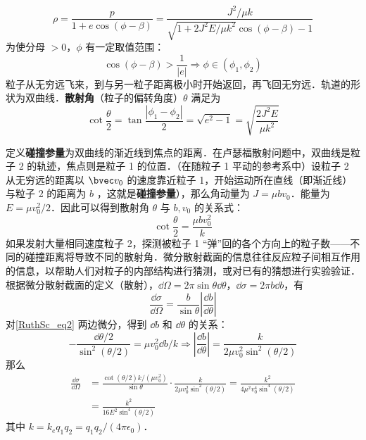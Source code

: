 \begin{equation}
\rho=\frac{p}{1+e\cos(\phi-\beta)}=\frac{J^2/\mu k}{\sqrt{1+2J^2E/\mu k^2}\cos(\phi-\beta)-1}
\end{equation}
为使分母 $>0$，$\phi$ 有一定取值范围：
\begin{equation}
\cos(\phi-\beta)>\frac{1}{|e|}
\Rightarrow \phi \in (\phi_1,\phi_2)
\end{equation}
粒子从无穷远飞来，到与另一粒子距离极小时开始返回，再飞回无穷远．轨道的形状为双曲线．\textbf{散射角}（粒子的偏转角度）$\theta$ 满足为
\begin{equation}
\cot\frac{\theta}{2}=\tan\frac{|\phi_1-\phi_2|}{2} =\sqrt{e^2-1}=\sqrt{\frac{2J^2E}{\mu k^2}}
\end{equation}

定义\textbf{碰撞参量}为双曲线的渐近线到焦点的距离．在卢瑟福散射问题中，双曲线是粒子 2 的轨迹，焦点则是粒子 1 的位置．（在随粒子 1 平动的参考系中）设粒子 2 从无穷远的距离以 $\bvec v_0$ 的速度靠近粒子 1，开始运动所在直线（即渐近线）与粒子 2 的距离为 $b$ ，这就是\textbf{碰撞参量}），那么角动量为 $J=\mu bv_0$．能量为 $E=\mu v_0^2/2$．因此可以得到散射角 $\theta$ 与 $b,v_0$ 的关系式：
\begin{equation}\label{RuthSc_eq2}
\cot \frac{\theta}{2}=\frac{\mu bv_0^2}{k}
\end{equation}
如果发射大量相同速度粒子 2，探测被粒子 1 “弹”回的各个方向上的粒子数——不同的碰撞距离将导致不同的散射角．微分散射截面的信息往往反应粒子间相互作用的信息，以帮助人们对粒子的内部结构进行猜测，或对已有的猜想进行实验验证．根据微分散射截面的定义（散射），$\dd \Omega=2\pi \sin\theta \dd \theta$，$\dd \sigma=2\pi b\dd b$，有
\begin{equation}
\frac{\dd \sigma}{\dd \Omega}=\frac{b}{\sin \theta}\left|\frac{\dd b}{\dd \theta}\right|
\end{equation}
对\autoref{RuthSc_eq2} 两边微分，得到 $\dd b$ 和 $\dd \theta$ 的关系：
\begin{equation}
-\frac{\dd \theta/2}{\sin^2(\theta/2)}=\mu v_0^2\dd b/k\Rightarrow \left|\frac{\dd b}{\dd \theta}\right|=\frac{k}{2\mu v_0^2\sin^2(\theta/2)}
\end{equation}
那么
\begin{equation}
\begin{aligned}
\frac{\dd \sigma}{\dd \Omega}&=\frac{\cot(\theta/2)k/(\mu v_0^2)}{\sin\theta}\cdot \frac{k}{2\mu v_0^2\sin^2(\theta/2)}=\frac{k^2}{4\mu ^2v_0^4\sin^4(\theta/2)}
\\
&=\frac{k^2}{16E^2\sin^4(\theta/2)}
\end{aligned}
\end{equation}
其中 $k=k_eq_1q_2=q_1q_2/(4\pi\epsilon_0)$．
